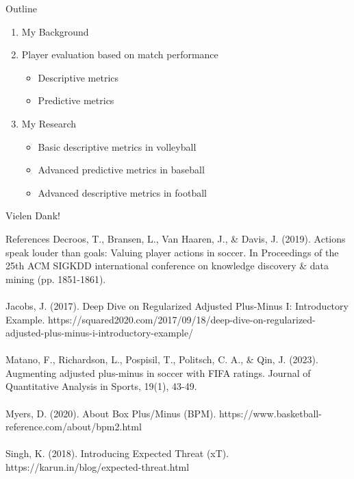\documentclass[handout]{beamer}
\begin{document}
\begin{frame}{Outline}
  \begin{enumerate}
    \item My Background
    \item Player evaluation based on match performance
    \begin{itemize}
      \item Descriptive metrics
      \item Predictive metrics
    \end{itemize}
    \item My Research
    \begin{itemize}
      \item Basic descriptive metrics in volleyball
      \item Advanced predictive metrics in baseball
      \item Advanced descriptive metrics in football
    \end{itemize}
  \end{enumerate}
\end{frame}


\begin{frame}
  \centering
  \LARGE
  Vielen Dank!
\end{frame}


\begin{frame}{References}
  \footnotesize
  Decroos, T., Bransen, L., Van Haaren, J., \& Davis, J. (2019). Actions speak louder than goals: Valuing player actions in soccer. In Proceedings of the 25th ACM SIGKDD international conference on knowledge discovery \& data mining (pp. 1851-1861).\\
  ~\\
  Jacobs, J. (2017). Deep Dive on Regularized Adjusted Plus-Minus I: Introductory Example. https://squared2020.com/2017/09/18/deep-dive-on-regularized-adjusted-plus-minus-i-introductory-example/\\
  ~\\
  Matano, F., Richardson, L., Pospisil, T., Politsch, C. A., \& Qin, J. (2023). Augmenting adjusted plus-minus in soccer with FIFA ratings. Journal of Quantitative Analysis in Sports, 19(1), 43-49.\\
  ~\\
  Myers, D. (2020). About Box Plus/Minus (BPM). https://www.basketball-reference.com/about/bpm2.html\\
  ~\\
  Singh, K. (2018). Introducing Expected Threat (xT). https://karun.in/blog/expected-threat.html\\
\end{frame}
\end{document}
